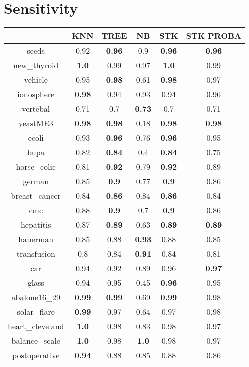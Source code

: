 \documentclass{article}%
\begin{document}
\section*{Sensitivity}%
\begin{tabular}{c|ccccc}%
&KNN&TREE&NB&STK&STK PROBA\\%
\hline%
seeds&0.92&\textbf{0.96}&0.9&\textbf{0.96}&\textbf{0.96}\\%
new\_thyroid&\textbf{1.0}&0.99&0.97&\textbf{1.0}&0.99\\%
vehicle&0.95&\textbf{0.98}&0.61&\textbf{0.98}&0.97\\%
ionosphere&\textbf{0.98}&0.94&0.93&0.94&0.96\\%
vertebal&0.71&0.7&\textbf{0.73}&0.7&0.71\\%
yeastME3&\textbf{0.98}&\textbf{0.98}&0.18&\textbf{0.98}&\textbf{0.98}\\%
ecoli&0.93&\textbf{0.96}&0.76&\textbf{0.96}&0.95\\%
bupa&0.82&\textbf{0.84}&0.4&\textbf{0.84}&0.75\\%
horse\_colic&0.81&\textbf{0.92}&0.79&\textbf{0.92}&0.89\\%
german&0.85&\textbf{0.9}&0.77&\textbf{0.9}&0.86\\%
breast\_cancer&0.84&\textbf{0.86}&0.84&\textbf{0.86}&0.84\\%
cmc&0.88&\textbf{0.9}&0.7&\textbf{0.9}&0.86\\%
hepatitis&0.87&\textbf{0.89}&0.63&\textbf{0.89}&\textbf{0.89}\\%
haberman&0.85&0.88&\textbf{0.93}&0.88&0.85\\%
transfusion&0.8&0.84&\textbf{0.91}&0.84&0.81\\%
car&0.94&0.92&0.89&0.96&\textbf{0.97}\\%
glass&0.94&0.95&0.45&\textbf{0.96}&0.95\\%
abalone16\_29&\textbf{0.99}&\textbf{0.99}&0.69&\textbf{0.99}&0.98\\%
solar\_flare&\textbf{0.99}&0.97&0.64&0.97&0.98\\%
heart\_cleveland&\textbf{1.0}&0.98&0.83&0.98&0.97\\%
balance\_scale&\textbf{1.0}&0.98&\textbf{1.0}&0.98&0.97\\%
postoperative&\textbf{0.94}&0.88&0.85&0.88&0.86\\%
\end{tabular}

%
\end{document}

